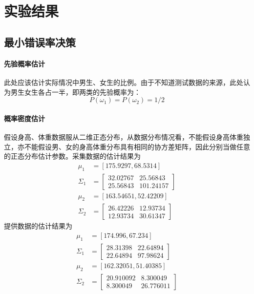 \section{实验结果}
\subsection{最小错误率决策}
	\paragraph{先验概率估计} 此处应该估计实际情况中男生、女生的比例。由于不知道测试数据的来源，此处认为男生女生各占一半，即两类的先验概率为：
	\begin{equation}
		P(\omega_1)=P(\omega_2)=1/2
	\end{equation}
	\paragraph{概率密度估计} 假设身高、体重数据服从二维正态分布，从数据分布情况看，不能假设身高体重独立，亦不能假设男、女的身高体重分布具有相同的协方差矩阵，因此分别当做任意的正态分布估计参数。采集数据的估计结果为
	\begin{align}
		\mu_1 &= [175.9297,68.5314]\\
		\Sigma_1 &= \begin{bmatrix}
		32.02767 & 25.56843 \\
		25.56843 & 101.24157
		\end{bmatrix}\\
		\mu_2 &= [163.54651,52.42209]\\
		\Sigma_2 &= \begin{bmatrix}
		26.42226 & 12.93734 \\
		12.93734 & 30.61347
		\end{bmatrix}
	\end{align}
	提供数据的估计结果为
	\begin{align}
		\mu_1 &= [174.996,67.234]\\
		\Sigma_1 &= \begin{bmatrix}
		28.31398 & 22.64894 \\
		22.64894 & 97.98624
		\end{bmatrix}\\
		\mu_2 &= [162.32051,51.40385]\\
		\Sigma_2 &= \begin{bmatrix}
		20.910092 & 8.300049 \\
		8.300049 & 26.776011
		\end{bmatrix}
	\end{align}
